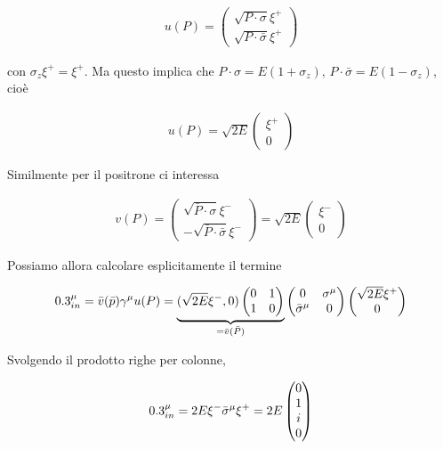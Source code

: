\documentclass[11pt]{report}
\begin{document}
\begin{align}
    u(P) = \begin{pmatrix}
        \sqrt{P\cdot \sigma}\xi^+ \\
        \sqrt{P\cdot \bar{\sigma}}\xi^+
    \end{pmatrix}
\end{align}

con \(\sigma_z \xi^+ = \xi^+\). Ma questo implica che \(P\cdot \sigma = E(1+\sigma_z), \, P\cdot \bar{\sigma} = E(1-\sigma_z)\), cioè 

\begin{align}
    u(P) = \sqrt{2E}\begin{pmatrix}
        \xi^+ \\ 0
    \end{pmatrix}
\end{align}

Similmente per il positrone ci interessa 

\begin{align}
    v(P) = \begin{pmatrix}
        \sqrt{\bar{P}\cdot \sigma} \xi^- \\
        -\sqrt{\bar{P}\cdot \bar{\sigma}} \xi^- 
    \end{pmatrix} = \sqrt{2E} \begin{pmatrix}
        \xi^- \\ 0 
    \end{pmatrix}
\end{align}

Possiamo allora calcolare esplicitamente il termine 

\begin{align}
    0.3^\mu_{in} = \bar{v}(\bar{p})\gamma^\mu u(P) = \underbrace{(\sqrt{2E}\xi^-, 0)\begin{pmatrix}
        0 & 1 \\ 
        1 & 0 
    \end{pmatrix}}_{=\bar{v}(\bar{P})}\begin{pmatrix}
        0 & \sigma^\mu \\ 
        \bar{\sigma}^\mu & 0 
    \end{pmatrix}\begin{pmatrix}
        \sqrt{2E}\xi^ + \\ 0 
    \end{pmatrix}
\end{align} 

Svolgendo il prodotto righe per colonne, 

\begin{align}
    0.3^\mu_{in} = 2E \xi^-\bar{\sigma}^\mu \xi^+ = 2E \begin{pmatrix}
        0 \\ 1 \\ i \\ 0
    \end{pmatrix}
\end{align}
\end{document}
